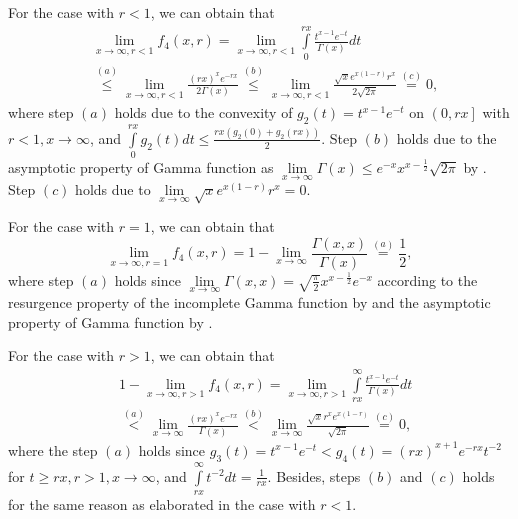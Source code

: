 \documentclass[conference]{IEEEtran}
\begin{document}
For the case with $r<1$, we can obtain that
\begin{equation}\label{app1}
	\begin{aligned}
&\mathop {\lim }\limits_{x \to \infty ,r < 1} \!{f_4}(x,r) \!=\! \mathop {\lim }\limits_{x \to \infty ,r < 1} \!\int\limits_0^{rx} {\frac{{{t^{x - 1}}{e^{ - t}}}}{{\Gamma \left( x \right)}}dt}\\
& \mathop  \leqslant \limits^{(a)} \!\mathop {\lim }\limits_{x \to \infty ,r < 1} \frac{{{{\left( {rx} \right)}^x}{e^{ - rx}}}}{{2\Gamma \left( x \right)}}\mathop  \leqslant \limits^{(b)} \!\mathop {\lim }\limits_{x \to \infty ,r < 1} \!\!\frac{{\sqrt x {e^{x\left( {1 - r} \right)}}{r^x}}}{{2\sqrt {2\pi } }}\mathop  = \limits^{(c)} 0,
	\end{aligned}
\end{equation}
where step $(a)$ holds due to the convexity of ${g_2}\left( t \right) = {t^{x - 1}}{e^{ - t}}$ on $\left( {0,rx} \right]$ with $r \!<\! 1,x \!\to\! \infty$, and $\int\limits_0^{rx} {g_2(t)dt}  \leqslant \frac{{rx\left( {g_2(0) + g_2(rx)} \right)}}{2}$. Step $(b)$ holds due to the asymptotic property of Gamma function as $\mathop {\lim }\limits_{x \to \infty } \Gamma (x) \!\leq\! {e^{ - x}}{x^{x - \frac{1}{2}}}\sqrt {2\pi }$ by \cite[(1.43)]{gamma_asy}. Step $(c)$ holds due to $\mathop {\lim }\limits_{x \to \infty } \sqrt x {e^{x\left( {1 - r} \right)}}{r^x} = 0$.

For the case with $r=1$, we can obtain that
\begin{equation}
	\mathop {\lim }\limits_{x \to \infty ,r = 1} f_4(x,r) = 1 - \mathop {\lim }\limits_{x \to \infty } \frac{{\Gamma (x,x)}}{{\Gamma (x)}}\mathop  = \limits^{(a)} \frac{1}{2},
\end{equation}
where step $(a)$ holds since $\mathop {\lim }\limits_{x \to \infty } \Gamma (x,x) = \sqrt {\frac{\pi }{2}} {x^{x - \frac{1}{2}}}{e^{ - x}}$ according to the resurgence property of the incomplete Gamma function by \cite[(1.2)]{gamma_resurg} and the asymptotic property of Gamma function by \cite[(1.43)]{gamma_asy}.

For the case with $r>1$, we can obtain that 
\begin{equation}
	\begin{aligned}
	&1 \!-\! \mathop {\lim }\limits_{x \to \infty ,r > 1} f_4(x,r) = \mathop {\lim }\limits_{x \to \infty ,r > 1} \int\limits_{rx}^\infty  {\frac{{{t^{x - 1}}{e^{ - t}}}}{{\Gamma \left( x \right)}}dt} \\
	&\mathop  < \limits^{(a)} \mathop {\lim }\limits_{x \to \infty } \frac{{{{(rx)}^x}{e^{ - rx}}}}{{\Gamma \left( x \right)}}\mathop  < \limits^{(b)} \mathop {\lim }\limits_{x \to \infty } \frac{{\sqrt x {r^x}{e^{x(1 - r)}}}}{{\sqrt {2\pi } }}\mathop  = \limits^{(c)} 0,
	\end{aligned}
\end{equation}
where the step $(a)$ holds since ${g_3}\left( t \right) = {t^{x - 1}}{e^{ - t}} < {g_4}(t) = {(rx)^{x + 1}}{e^{ - rx}}{t^{ - 2}}$ for ${t \geqslant rx,r > 1,x \to \infty }$, and $\int\limits_{rx}^\infty  {{t^{ - 2}}dt}  = \frac{1}{{rx}}$. Besides, steps $(b)$ and $(c)$ holds for the same reason as elaborated in the case with $r<1$.
\end{document}
